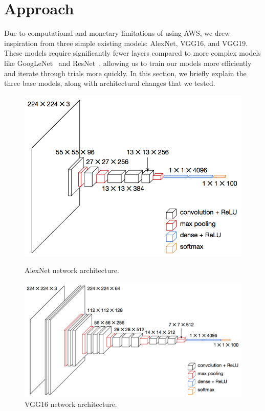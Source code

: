 \documentclass[10pt,twocolumn,letterpaper]{article}
\begin{document}
\section{Approach}\label{sec:approach}
Due to computational and monetary limitations of using AWS, we drew inspiration from three simple existing models: AlexNet, VGG16, and VGG19. These models require significantly fewer layers compared to more complex models like GoogLeNet~\cite{googlenet} and ResNet~\cite{resnet}, allowing us to train our models more efficiently and iterate through trials more quickly. In this section, we briefly explain the three base models, along with architectural changes that we tested.

\begin{figure}[ht]
\centering
\begin{minipage}{.42\linewidth}
\centering
\includegraphics[width=.95\linewidth]{imgs/alexnet.png}
\caption{AlexNet network architecture.}
\label{fig:alexnet}
\end{minipage}%
\begin{minipage}{.58\linewidth}
\centering
\includegraphics[width=.95\linewidth]{imgs/vgg16.png}
\caption{VGG16 network architecture.}
\label{fig:vgg16}
\end{minipage}
\end{figure}
\end{document}
